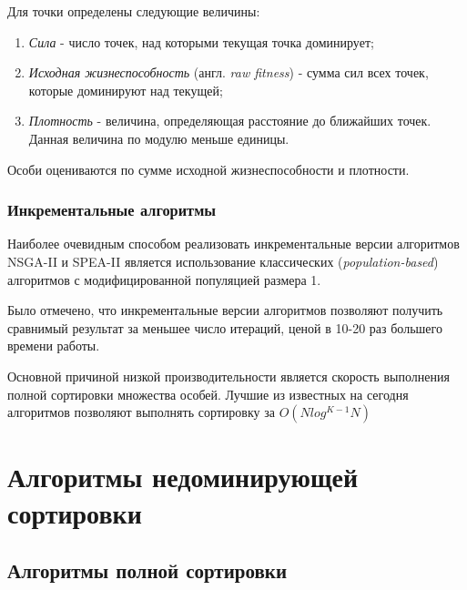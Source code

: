 Для точки определены следующие величины: \cite{spea2}
\begin{enumerate}
 \item \textit{Сила} - число точек, над которыми текущая точка доминирует;
 \item \textit{Исходная жизнеспособность} (англ. \textit{raw fitness}) - сумма сил всех точек, 
	которые доминируют над текущей;
 \item \textit{Плотность} - величина, определяющая расстояние до ближайших точек.
	Данная величина по модулю меньше единицы.
\end{enumerate}

Особи оцениваются по сумме исходной жизнеспособности и плотности.

\subsubsection{Инкрементальные алгоритмы}
Наиболее очевидным способом реализовать инкрементальные версии алгоритмов NSGA-II и SPEA-II
является использование классических (\textit{population-based}) алгоритмов с модифицированной
популяцией размера 1. \cite{inc_nsga2_spea2}

Было отмечено, что инкрементальные версии алгоритмов позволяют получить сравнимый результат
за меньшее число итераций, ценой в 10-20 раз большего времени работы.

Основной причиной низкой производительности является скорость выполнения полной сортировки
множества особей. Лучшие из известных на сегодня алгоритмов позволяют выполнять сортировку 
за $O(Nlog^{K-1}N)$

\section{Алгоритмы недоминирующей сортировки}
\subsection{Алгоритмы полной сортировки}
